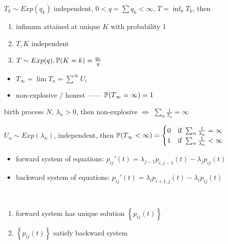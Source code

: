 \begin{prop}
    $T_k \sim Exp(q_k)$ independent, $0 < q = \sum q_k < \infty$, $T = \inf_k T_k$, then
    \begin{enumerate}
        \item infimum attained at unique $K$ with probability 1
        \item $T, K$ independent
        \item $T \sim Exp(q), \mathbb{P}(K = k) = \frac{q_k}{q}$
    \end{enumerate}
\end{prop}

\begin{itemize}
    \item $T_\infty = \lim T_n = \sum^\infty U_i$
    \item non-explosive / honest ------ $\mathbb{P}(T_\infty = \infty) = 1$
\end{itemize}

\begin{thm}
    birth process $N$, $\lambda_n > 0$, then non-explosive $\iff$ $\sum_n \frac{1}{\lambda_n} = \infty$
\end{thm}

\begin{lemma}
    $U_n \sim Exp(\lambda_n)$, independent, then $\mathbb{P}(T_\infty < \infty) = \begin{cases}
                                                     0 & \text{if } \sum_n \frac{1}{\lambda_n} = \infty\\
                                                     1 & \text{if } \sum_n \frac{1}{\lambda_n} < \infty\\
    \end{cases}$
\end{lemma}

\begin{itemize}
    \item forward system of equations: $p_{ij}'(t) = \lambda_{j-1}p_{i, j-1}(t) - \lambda_j p_{ij}(t)$
    \item backward system of equations: $p_{ij}'(t) = \lambda_i p_{i+1, j}(t) - \lambda_i p_{ij}(t)$
\end{itemize}

\begin{thm}\,
    \begin{enumerate}
        \item forward system has unique solution $\left\{ p_{ij}(t) \right\}$
        \item $\left\{ p_{ij}(t) \right\}$ satisfy backward system
    \end{enumerate}
\end{thm}


